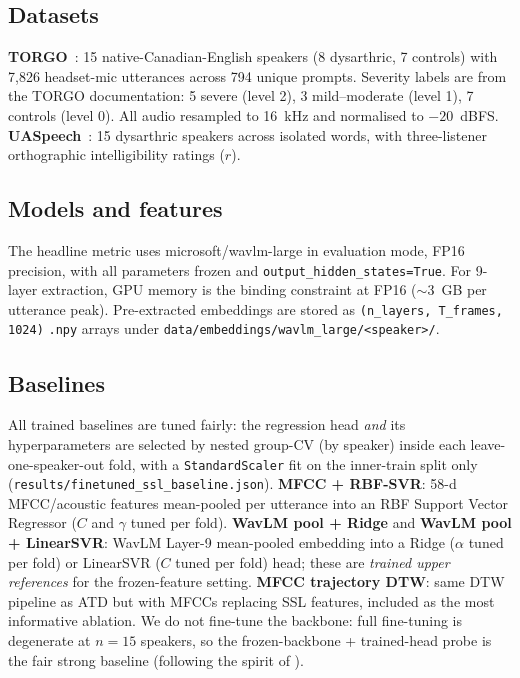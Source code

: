 
\subsection{Datasets}
\textbf{TORGO}~\cite{Rudzicz2012TORGO}: 15 native-Canadian-English
speakers (8 dysarthric, 7 controls) with 7{,}826 headset-mic utterances
across 794 unique prompts. Severity labels are from the
TORGO documentation: 5 severe (level 2), 3 mild--moderate (level 1), 7
controls (level 0). All audio resampled to 16~kHz and normalised to
$-20$~dBFS.
\textbf{UASpeech}~\cite{Kim2008UASpeech}: 15 dysarthric speakers across
isolated words, with three-listener orthographic intelligibility ratings
($r$).

\subsection{Models and features}
The headline metric uses microsoft/wavlm-large in evaluation mode, FP16
precision, with all parameters frozen and \texttt{output\_hidden\_states=True}.
For 9-layer extraction, GPU memory is the binding constraint at FP16 ($\sim$3~GB
per utterance peak). Pre-extracted embeddings are stored as
\texttt{(n\_layers, T\_frames, 1024)} \texttt{.npy} arrays under
\texttt{data/embeddings/wavlm\_large/<speaker>/}.

\subsection{Baselines}
All trained baselines are tuned fairly: the regression head \emph{and} its
hyperparameters are selected by nested group-CV (by speaker) inside each
leave-one-speaker-out fold, with a \texttt{StandardScaler} fit on the
inner-train split only (\texttt{results/finetuned\_ssl\_baseline.json}).
\textbf{MFCC + RBF-SVR}: 58-d MFCC/acoustic features mean-pooled per
utterance into an RBF Support Vector Regressor ($C$ and $\gamma$ tuned per
fold). \textbf{WavLM pool + Ridge} and \textbf{WavLM pool + LinearSVR}:
WavLM Layer-9 mean-pooled embedding into a Ridge ($\alpha$ tuned per fold)
or LinearSVR ($C$ tuned per fold) head; these are \emph{trained upper
references} for the frozen-feature setting. \textbf{MFCC trajectory DTW}:
same DTW pipeline as ATD but with MFCCs replacing SSL features, included as
the most informative ablation. We do not fine-tune the backbone: full
fine-tuning is degenerate at $n=15$ speakers, so the frozen-backbone +
trained-head probe is the fair strong baseline (following the spirit of
\cite{Hernandez2020SSLDysarthria,Schu2023SSLDys}).

